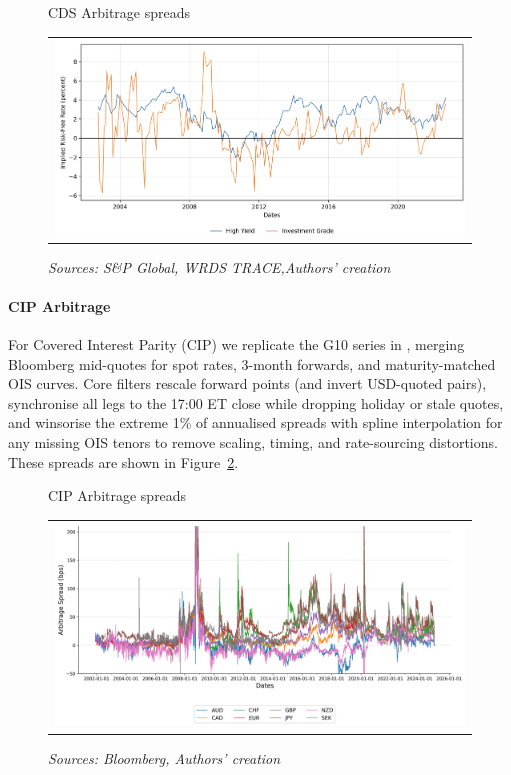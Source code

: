 \documentclass{article}
\begin{document}
\begin{figure}[h]
    \centering
    \caption{CDS Arbitrage spreads}
  \begin{tabular}{@{}c@{}}
    \includegraphics[width=.95\linewidth]{../docs_src/CDS_replicate.png}
  \end{tabular}
  \caption*{\emph{Sources: S\&P Global, WRDS TRACE,Authors' creation}}
  \label{fig:cds_basis}
\end{figure}

\paragraph{CIP Arbitrage}
For Covered Interest Parity (CIP) we replicate the G10 series in \citet{Du2018}, merging Bloomberg mid-quotes for spot rates, 3-month forwards, and maturity-matched OIS curves.  Core filters rescale forward points (and invert USD-quoted pairs), synchronise all legs to the 17:00 ET close while dropping holiday or stale quotes, and winsorise the extreme 1\% of annualised spreads with spline interpolation for any missing OIS tenors to remove scaling, timing, and rate-sourcing distortions. These spreads are shown in Figure~\ref{fig:cip_basis}.

\begin{figure}[h]
    \centering
    \caption{CIP Arbitrage spreads}
  \begin{tabular}{@{}c@{}}
    \includegraphics[width=.95\linewidth]{../docs_src/CIP_replicate.png}
  \end{tabular}
  \caption*{\emph{Sources: Bloomberg, Authors' creation}}
  \label{fig:cip_basis}
\end{figure}
\end{document}
